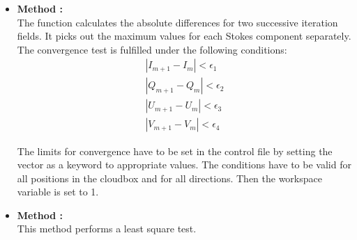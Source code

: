 \begin{itemize}
\item {\bf Method :}\\
The function calculates the absolute differences for two successive
iteration fields. It picks out the maximum values for each Stokes 
component separately. The convergence test is fulfilled under the
following conditions:
\begin{eqnarray}
|I_{m+1} - I_m| < \epsilon_1    \\
|Q_{m+1} - Q_m| < \epsilon_2    \\
|U_{m+1} - U_m| < \epsilon_3    \\
|V_{m+1} - V_m| < \epsilon_4     
\end{eqnarray}

The limits for convergence have to be set in the control file by 
setting the vector  as a keyword 
to appropriate values.
The conditions have to be valid for all positions in the cloudbox 
and for all directions.
Then the workspace variable  is set to 1.

\item {\bf Method :}\\
This method performs a least square test.
\end{itemize}



 



